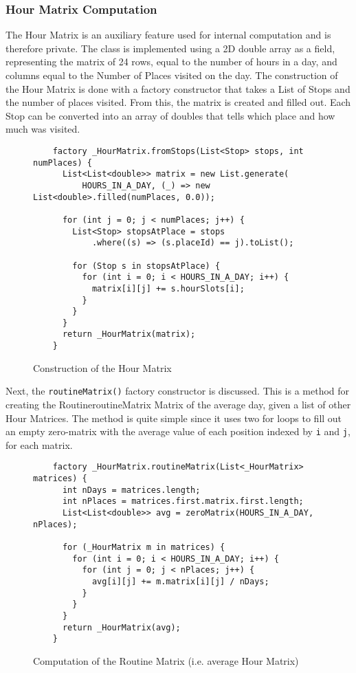 \subsubsection*{Hour Matrix Computation}
The Hour Matrix is an auxiliary feature used for internal computation and is therefore private. The class is implemented using a 2D double array as a field, representing the matrix of 24 rows, equal to the number of hours in a day, and columns equal to the Number of Places visited on the day. The construction of the Hour Matrix is done with a factory constructor that takes a List of Stops and the number of places visited. From this, the matrix is created and filled out. Each Stop can be converted into an array of doubles that tells which place and how much was visited.

\begin{figure}
    \centering
    \begin{verbatim}
    factory _HourMatrix.fromStops(List<Stop> stops, int numPlaces) {
      List<List<double>> matrix = new List.generate(
          HOURS_IN_A_DAY, (_) => new List<double>.filled(numPlaces, 0.0));
    
      for (int j = 0; j < numPlaces; j++) {
        List<Stop> stopsAtPlace = stops
            .where((s) => (s.placeId) == j).toList();
    
        for (Stop s in stopsAtPlace) {
          for (int i = 0; i < HOURS_IN_A_DAY; i++) {
            matrix[i][j] += s.hourSlots[i];
          }
        }
      }
      return _HourMatrix(matrix);
    }
    \end{verbatim}
    \caption{Construction of the Hour Matrix}
    \label{fig:hour-matrix-construction}
\end{figure}

Next, the \verb|routineMatrix()| factory constructor is discussed. This is a method for creating the RoutineroutineMatrix Matrix of the average day, given a list of other Hour Matrices. The method is quite simple since it uses two for loops to fill out an empty zero-matrix with the average value of each position indexed by \verb|i| and \verb|j|, for each matrix.

\begin{figure}
    \centering
    \begin{verbatim}
    factory _HourMatrix.routineMatrix(List<_HourMatrix> matrices) {
      int nDays = matrices.length;
      int nPlaces = matrices.first.matrix.first.length;
      List<List<double>> avg = zeroMatrix(HOURS_IN_A_DAY, nPlaces);
    
      for (_HourMatrix m in matrices) {
        for (int i = 0; i < HOURS_IN_A_DAY; i++) {
          for (int j = 0; j < nPlaces; j++) {
            avg[i][j] += m.matrix[i][j] / nDays;
          }
        }
      }
      return _HourMatrix(avg);
    }
    \end{verbatim}
    \caption{Computation of the Routine Matrix (i.e. average Hour Matrix)}
    \label{fig:hour-matrix-average}
\end{figure}

